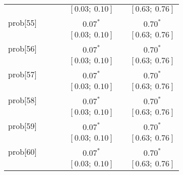 \begin{table}
\begin{center}
\begin{tabular}{l c c c c c c }
          &                           &                           &                           & $[0.03;\ 0.10]$         &                           & $[0.63;\ 0.76]$       \\
prob[55]  &                           &                           &                           & $0.07^{*}$              &                           & $0.70^{*}$            \\
          &                           &                           &                           & $[0.03;\ 0.10]$         &                           & $[0.63;\ 0.76]$       \\
prob[56]  &                           &                           &                           & $0.07^{*}$              &                           & $0.70^{*}$            \\
          &                           &                           &                           & $[0.03;\ 0.10]$         &                           & $[0.63;\ 0.76]$       \\
prob[57]  &                           &                           &                           & $0.07^{*}$              &                           & $0.70^{*}$            \\
          &                           &                           &                           & $[0.03;\ 0.10]$         &                           & $[0.63;\ 0.76]$       \\
prob[58]  &                           &                           &                           & $0.07^{*}$              &                           & $0.70^{*}$            \\
          &                           &                           &                           & $[0.03;\ 0.10]$         &                           & $[0.63;\ 0.76]$       \\
prob[59]  &                           &                           &                           & $0.07^{*}$              &                           & $0.70^{*}$            \\
          &                           &                           &                           & $[0.03;\ 0.10]$         &                           & $[0.63;\ 0.76]$       \\
prob[60]  &                           &                           &                           & $0.07^{*}$              &                           & $0.70^{*}$            \\
          &                           &                           &                           & $[0.03;\ 0.10]$         &                           & $[0.63;\ 0.76]$       \\

\end{tabular}
\end{center}
\end{table}
